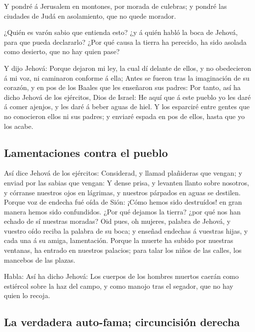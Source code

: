  Y pondré á Jerusalem en montones, por morada de culebras;
y pondré las ciudades de Judá en asolamiento, que no quede morador.

 ¿Quién es varón sabio que entienda esto? ¿y á quién habló
la boca de Jehová, para que pueda declararlo? ¿Por qué causa la tierra
ha perecido, ha sido asolada como desierto, que no hay quien pase?

 Y dijo Jehová: Porque dejaron mi ley, la cual dí delante
de ellos, y no obedecieron á mi voz, ni caminaron conforme á ella;
 Antes se fueron tras la imaginación de su corazón, y en
pos de los Baales que les enseñaron sus padres:  Por tanto,
así ha dicho Jehová de los ejércitos, Dios de Israel: He aquí que á este
pueblo yo les daré á comer ajenjos, y les daré á beber aguas de hiel.
 Y los esparciré entre gentes que no conocieron ellos ni
sus padres; y enviaré espada en pos de ellos, hasta que yo los acabe.

\hypertarget{lamentaciones-contra-el-pueblo}{%
\subsection{Lamentaciones contra el
pueblo}\label{lamentaciones-contra-el-pueblo}}

 Así dice Jehová de los ejércitos: Considerad, y llamad
plañideras que vengan; y enviad por las sabias que vengan: 
Y dense prisa, y levanten llanto sobre nosotros, y córranse nuestros
ojos en lágrimas, y nuestros párpados en aguas se destilen.
 Porque voz de endecha fué oída de Sión: ¡Cómo hemos sido
destruídos! en gran manera hemos sido confundidos. ¿Por qué dejamos la
tierra? ¿por qué nos han echado de sí nuestras moradas? 
Oid pues, oh mujeres, palabra de Jehová, y vuestro oído reciba la
palabra de su boca; y enseñad endechas á vuestras hijas, y cada una á su
amiga, lamentación.  Porque la muerte ha subido por
nuestras ventanas, ha entrado en nuestros palacios; para talar los niños
de las calles, los mancebos de las plazas.

 Habla: Así ha dicho Jehová: Los cuerpos de los hombres
muertos caerán como estiércol sobre la haz del campo, y como manojo tras
el segador, que no hay quien lo recoja.

\hypertarget{la-verdadera-auto-fama-circuncisiuxf3n-derecha}{%
\subsection{La verdadera auto-fama; circuncisión
derecha}\label{la-verdadera-auto-fama-circuncisiuxf3n-derecha}}

